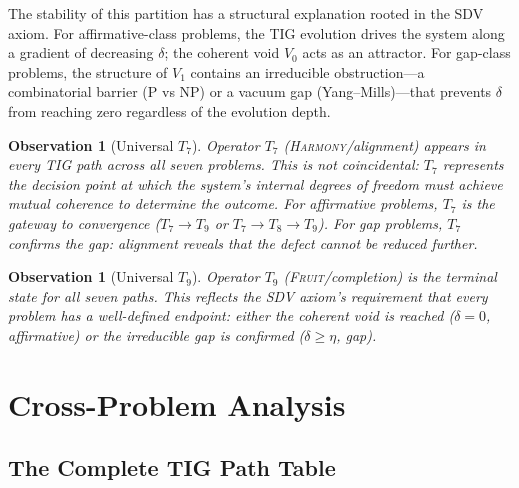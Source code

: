 \documentclass[11pt]{article}
\newtheorem{observation}[theorem]{Observation}
\begin{document}
The stability of this partition has a structural explanation rooted in
the SDV axiom.  For affirmative-class problems, the TIG evolution
drives the system along a gradient of decreasing $\delta$; the
coherent void $V_0$ acts as an attractor.  For gap-class problems,
the structure of $V_1$ contains an irreducible obstruction---a
combinatorial barrier (P vs NP) or a vacuum gap (Yang--Mills)---that
prevents $\delta$ from reaching zero regardless of the evolution depth.

\begin{observation}[Universal $T_7$]
\label{obs:T7}
Operator $T_7$ (\textsc{Harmony}/alignment) appears in every TIG
path across all seven problems.  This is not coincidental: $T_7$
represents the decision point at which the system's internal degrees
of freedom must achieve mutual coherence to determine the outcome.
For affirmative problems, $T_7$ is the gateway to convergence
($T_7 \to T_9$ or $T_7 \to T_8 \to T_9$).  For gap problems,
$T_7$ confirms the gap: alignment reveals that the defect cannot
be reduced further.
\end{observation}

\begin{observation}[Universal $T_9$]
\label{obs:T9}
Operator $T_9$ (\textsc{Fruit}/completion) is the terminal state for
all seven paths.  This reflects the SDV axiom's requirement that every
problem has a well-defined endpoint: either the coherent void is
reached ($\delta = 0$, affirmative) or the irreducible gap is confirmed
($\delta \geq \eta$, gap).
\end{observation}

\section{Cross-Problem Analysis}
\label{sec:cross}

\subsection{The Complete TIG Path Table}
\label{subsec:path-table}
\end{document}

